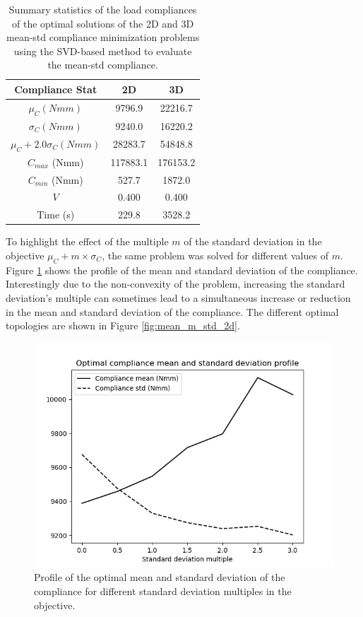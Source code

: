       \begin{table}[h!]
       \centering
       \caption{Summary statistics of the load compliances of the optimal solutions of the 2D and 3D mean-std compliance minimization problems using the SVD-based method to evaluate the mean-std compliance.}
       \begin{tabular}{|c|c|c|}
        \hline
        Compliance Stat & 2D & 3D \\
        \hline
        \hline
        $\mu_C (Nmm) $ & 9796.9 & 22216.7 \\
        \hline
        $\sigma_C (Nmm) $ & 9240.0 & 16220.2 \\
        \hline
        $\mu_C + 2.0 \sigma_C (Nmm) $ & 28283.7 & 54848.8 \\
        \hline
        $C_{max}$ (Nmm) & 117883.1 & 176153.2 \\
        \hline
        $C_{min}$ (Nmm) & 527.7 & 1872.0 \\
        \hline
        $V$ & 0.400 & 0.400 \\
        \hline
        Time (s) & 229.8 & 3528.2 \\
        \hline
       \end{tabular}
       \label{tab:mean_std_stats}
      \end{table}

      To highlight the effect of the multiple $m$ of the standard deviation in the objective $\mu_C + m \times \sigma_C$, the same problem was solved for different values of $m$. Figure \ref{fig:mean_std_profile} shows the profile of the mean and standard deviation of the compliance. Interestingly due to the non-convexity of the problem, increasing the standard deviation's multiple can sometimes lead to a simultaneous increase or reduction in the mean and standard deviation of the compliance. The different optimal topologies are shown in Figure \ref{fig:mean_m_std_2d}.

      \begin{figure}
        \centering
        \includegraphics[width=\textwidth]{./images/robust_exact/mean_std_profile.png}
        \caption{Profile of the optimal mean and standard deviation of the compliance for different standard deviation multiples in the objective.}
        \label{fig:mean_std_profile}
      \end{figure}

